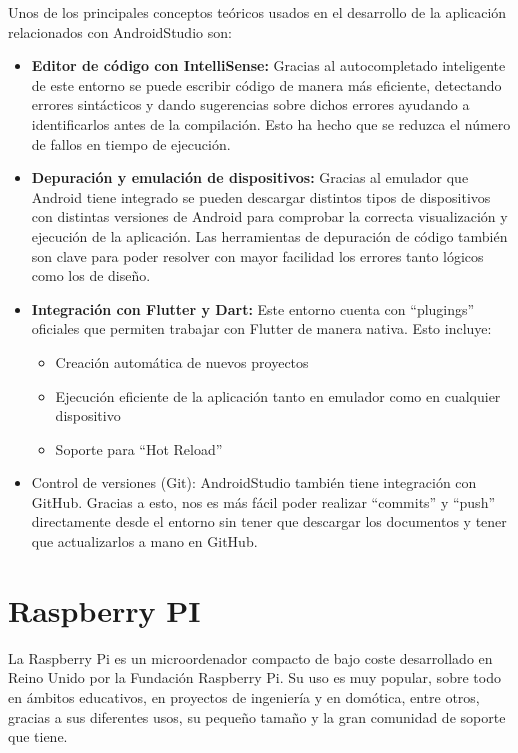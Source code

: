 Unos de los principales conceptos teóricos usados en el desarrollo de la aplicación relacionados con AndroidStudio son:

\begin{itemize}
    \item \textbf{Editor de código con IntelliSense:} Gracias al autocompletado inteligente de este entorno se puede escribir código de manera más eficiente, detectando errores sintácticos y dando sugerencias sobre dichos errores ayudando a identificarlos antes de la compilación. Esto ha hecho que se reduzca el número de fallos en tiempo de ejecución.
    
    \item \textbf{Depuración y emulación de dispositivos:} Gracias al emulador que Android tiene integrado se  pueden descargar distintos tipos de dispositivos con distintas versiones de Android para comprobar la correcta visualización y ejecución de la aplicación. Las herramientas de depuración de código también son clave para poder resolver con mayor facilidad los errores tanto lógicos como los de diseño. 
    
    \item \textbf{Integración con Flutter y Dart:} Este entorno cuenta con ``plugings'' oficiales que permiten trabajar con Flutter de manera nativa. Esto incluye:
    \begin{itemize}
        \item {Creación automática de nuevos proyectos}
        \item {Ejecución eficiente de la aplicación tanto en emulador como en cualquier dispositivo}
        \item {Soporte para ``Hot Reload''}
    \end{itemize}
    
    \item {Control de versiones (Git):} AndroidStudio también tiene integración con GitHub. Gracias a esto, nos es más fácil poder realizar ``commits'' y ``push'' directamente desde el entorno sin tener que descargar los documentos y tener que actualizarlos a mano en GitHub.
\end{itemize}


\section{Raspberry PI}
La Raspberry Pi es un microordenador compacto de bajo coste desarrollado en Reino Unido por la Fundación Raspberry Pi. Su uso es muy popular, sobre todo en ámbitos educativos, en proyectos de ingeniería y en domótica, entre otros, gracias a sus diferentes usos, su pequeño tamaño y la gran comunidad de soporte que tiene.

